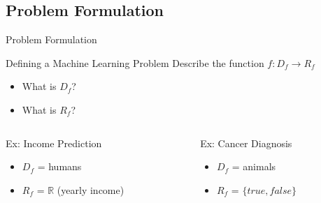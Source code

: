\documentclass[14pt]{beamer}
\begin{document}
\subsection{Problem Formulation}
\begin{frame}{Problem Formulation}
	\begin{block}{Defining a Machine Learning Problem}
		Describe the function $f\!: D_f \rightarrow R_f$
		\begin{itemize}
			\item What is $D_f$?
			\item What is $R_f$?
		\end{itemize}
	\end{block}
	\pause
	\begin{columns}
		\begin{column}{2in}
			\begin{block}{Ex: Income Prediction}
				\begin{itemize}
					\pause
					\item $D_f$ = \pause humans
					\pause
					\item $R_f$ = \pause $\mathbb{R}$ (yearly income)
				\end{itemize}
			\end{block}
		\end{column}
		\pause
		\begin{column}{2in}
			\begin{block}{Ex: Cancer Diagnosis}
				\begin{itemize}
					\pause
					\item $D_f$ = \pause animals
					\pause
					\item $R_f$ = \pause $\{\textit{true},\textit{false}\}$
				\end{itemize}
			\end{block}
		\end{column}
	\end{columns}
\end{frame}
\end{document}
